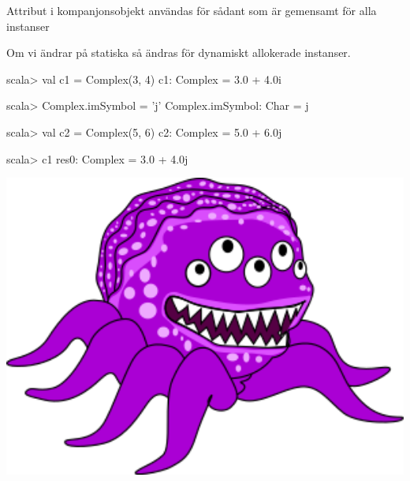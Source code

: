 \begin{Slide}{Attribut i kompanjonsobjekt användas för sådant som är gemensamt för alla instanser}

Om vi ändrar på statiska  så ändras  för  dynamiskt allokerade instanser.
\begin{REPLnonum}
scala> val c1 = Complex(3, 4)
c1: Complex = 3.0 + 4.0i

scala> Complex.imSymbol = 'j'
Complex.imSymbol: Char = j

scala> val c2 = Complex(5, 6)
c2: Complex = 5.0 + 6.0j

scala> c1
res0: Complex = 3.0 + 4.0j
\end{REPLnonum}
\end{Slide}



\ifkompendium\else
\begin{frame}[plain]
  \includegraphics[width=1.0\textwidth]{../img/mutant.png}
\end{frame}
\fi

